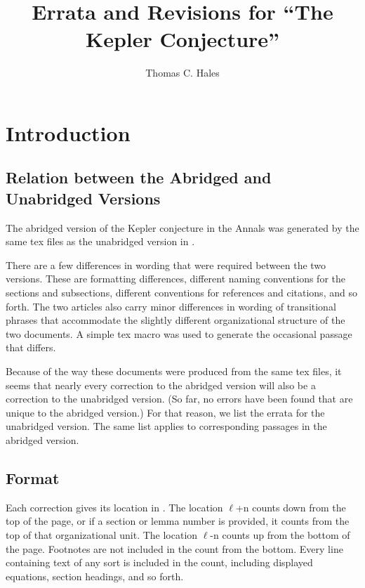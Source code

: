\documentclass[11pt]{amsart}
\def\line{$\ell$}
\begin{document}
\title{Errata and Revisions for ``The Kepler Conjecture''}

\author{Thomas C. Hales}
\address{Math Department, University of Pittsburgh}


\maketitle

\section{Introduction}


\subsection{Relation between the Abridged and Unabridged Versions}

The abridged version of the Kepler conjecture
in the Annals \cite{A}
was generated by the same tex
files as the unabridged version in \cite{DCG}.


There are a few differences in wording that
were required between the two versions.
These are formatting
differences, different naming
conventions for the sections and subsections,
different conventions for references and citations,
and so forth.
The two articles also carry minor differences
in wording of transitional phrases that
accommodate the slightly different organizational
structure of the two documents.  A simple
tex macro was used to generate the occasional passage
that differs.

Because of the way these documents were produced
from the same tex files,
it seems that nearly every correction to
the abridged version will also be a correction to the unabridged version.
(So far, no errors have been found that are
unique to the abridged version.)
For that reason, we list the errata for the
unabridged version. The same list applies to corresponding 
passages in the abridged version.  




\subsection{Format}

Each correction gives its location in \cite{DCG}.
The location
\line+n counts down from the top of the page, or
if a section or lemma number is provided, it
counts from the top of that organizational unit.
The location \line-n counts up from the bottom
of the page. Footnotes are not included in the
count from the bottom.  Every line containing
text of any sort is included in the count,
including displayed equations, section headings,
and so forth.
\end{document}
